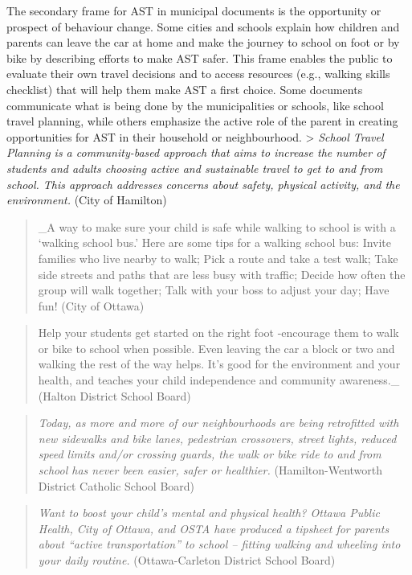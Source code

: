 \documentclass[]{elsarticle} %
\begin{document}
The secondary frame for AST in municipal documents is the opportunity or
prospect of behaviour change. Some cities and schools explain how
children and parents can leave the car at home and make the journey to
school on foot or by bike by describing efforts to make AST safer. This
frame enables the public to evaluate their own travel decisions and to
access resources (e.g., walking skills checklist) that will help them
make AST a first choice. Some documents communicate what is being done
by the municipalities or schools, like school travel planning, while
others emphasize the active role of the parent in creating opportunities
for AST in their household or neighbourhood. \textgreater{} \emph{School
Travel Planning is a community-based approach that aims to increase the
number of students and adults choosing active and sustainable travel to
get to and from school. This approach addresses concerns about safety,
physical activity, and the environment.} (City of Hamilton)

\begin{quote}
\_A way to make sure your child is safe while walking to school is with
a `walking school bus.' Here are some tips for a walking school bus:
Invite families who live nearby to walk; Pick a route and take a test
walk; Take side streets and paths that are less busy with traffic;
Decide how often the group will walk together; Talk with your boss to
adjust your day; Have fun! (City of Ottawa)
\end{quote}

\begin{quote}
Help your students get started on the right foot -encourage them to walk
or bike to school when possible. Even leaving the car a block or two and
walking the rest of the way helps. It's good for the environment and
your health, and teaches your child independence and community
awareness.\_ (Halton District School Board)
\end{quote}

\begin{quote}
\emph{Today, as more and more of our neighbourhoods are being
retrofitted with new sidewalks and bike lanes, pedestrian crossovers,
street lights, reduced speed limits and/or crossing guards, the walk or
bike ride to and from school has never been easier, safer or healthier.}
(Hamilton-Wentworth District Catholic School Board)
\end{quote}

\begin{quote}
\emph{Want to boost your child's mental and physical health? Ottawa
Public Health, City of Ottawa, and OSTA have produced a tipsheet for
parents about ``active transportation'' to school -- fitting walking and
wheeling into your daily routine.} (Ottawa-Carleton District School
Board)
\end{quote}
\end{document}
